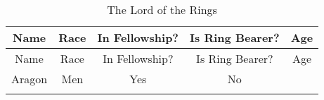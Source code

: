 \documentclass[
]{article}
\begin{document}
\begin{longtable}[]{@{}ccccc@{}}
\caption{The Lord of the Rings}\tabularnewline
\toprule
\begin{minipage}[b]{0.11\columnwidth}\centering
Name\strut
\end{minipage} & \begin{minipage}[b]{0.11\columnwidth}\centering
Race\strut
\end{minipage} & \begin{minipage}[b]{0.20\columnwidth}\centering
In Fellowship?\strut
\end{minipage} & \begin{minipage}[b]{0.21\columnwidth}\centering
Is Ring Bearer?\strut
\end{minipage} & \begin{minipage}[b]{0.08\columnwidth}\centering
Age\strut
\end{minipage}\tabularnewline
\midrule
\endfirsthead
\toprule
\begin{minipage}[b]{0.11\columnwidth}\centering
Name\strut
\end{minipage} & \begin{minipage}[b]{0.11\columnwidth}\centering
Race\strut
\end{minipage} & \begin{minipage}[b]{0.20\columnwidth}\centering
In Fellowship?\strut
\end{minipage} & \begin{minipage}[b]{0.21\columnwidth}\centering
Is Ring Bearer?\strut
\end{minipage} & \begin{minipage}[b]{0.08\columnwidth}\centering
Age\strut
\end{minipage}\tabularnewline
\midrule
\endhead
\begin{minipage}[t]{0.11\columnwidth}\centering
Aragon\strut
\end{minipage} & \begin{minipage}[t]{0.11\columnwidth}\centering
Men\strut
\end{minipage} & \begin{minipage}[t]{0.20\columnwidth}\centering
Yes\strut
\end{minipage} & \begin{minipage}[t]{0.21\columnwidth}\centering
No\strut
\end{minipage} & \begin{minipage}[t]{0.08\columnwidth}\centering
88\strut
\end{minipage}\tabularnewline
\begin{minipage}[t]{0.11\columnwidth}\centering

\end{minipage}
\end{longtable}
\end{document}
